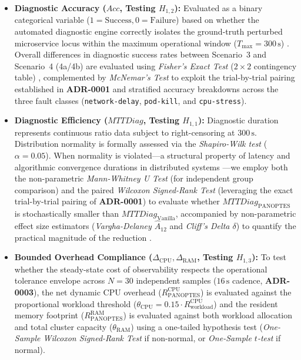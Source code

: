 \begin{itemize}
    \item \textbf{Diagnostic Accuracy ($Acc$, Testing $H_{1,2}$):} Evaluated as a binary categorical variable ($1 = \text{Success}, 0 = \text{Failure}$) based on whether the automated diagnostic engine correctly isolates the ground-truth perturbed microservice locus within the maximum operational window ($T_{\text{max}} = 300\,\text{s}$) \cite{wang_2024}. Overall differences in diagnostic success rates between Scenario~3 and Scenario~4 (4a/4b) are evaluated using \textit{Fisher's Exact Test} ($2\times2$ contingency table) \cite{agresti_2007}, complemented by \textit{McNemar's Test} to exploit the trial-by-trial pairing established in \textbf{ADR-0001} and stratified accuracy breakdowns across the three fault classes (\texttt{network-delay}, \texttt{pod-kill}, and \texttt{cpu-stress}).
    
    \item \textbf{Diagnostic Efficiency ($MTTDiag$, Testing $H_{1,1}$):} Diagnostic duration represents continuous ratio data subject to right-censoring at $300\,\text{s}$. Distribution normality is formally assessed via the \textit{Shapiro-Wilk test} ($\alpha = 0.05$). When normality is violated---a structural property of latency and algorithmic convergence durations in distributed systems \cite{barata_2026}---we employ both the non-parametric \textit{Mann-Whitney U Test} (for independent group comparison) and the paired \textit{Wilcoxon Signed-Rank Test} (leveraging the exact trial-by-trial pairing of \textbf{ADR-0001}) to evaluate whether $MTTDiag_{\text{PANOPTES}}$ is stochastically smaller than $MTTDiag_{\text{Vanilla}}$, accompanied by non-parametric effect size estimators (\textit{Vargha-Delaney $\hat{A}_{12}$} and \textit{Cliff's Delta $\delta$}) to quantify the practical magnitude of the reduction \cite{wohlin_2012}.
    
    \item \textbf{Bounded Overhead Compliance ($\Delta_{\text{CPU}}, \Delta_{\text{RAM}}$, Testing $H_{1,3}$):} To test whether the steady-state cost of observability respects the operational tolerance envelope across $N=30$ independent samples ($16\,\text{s}$ cadence, \textbf{ADR-0003}), the net dynamic CPU overhead ($R_{\text{PANOPTES}}^{\text{CPU}}$) is evaluated against the proportional workload threshold ($\theta_{\text{CPU}} = 0.15 \cdot R_{\text{workload}}^{\text{CPU}}$) and the resident memory footprint ($R_{\text{PANOPTES}}^{\text{RAM}}$) is evaluated against both workload allocation and total cluster capacity ($\theta_{\text{RAM}}$) using a one-tailed hypothesis test (\textit{One-Sample Wilcoxon Signed-Rank Test} if non-normal, or \textit{One-Sample $t$-test} if normal).
\end{itemize}

